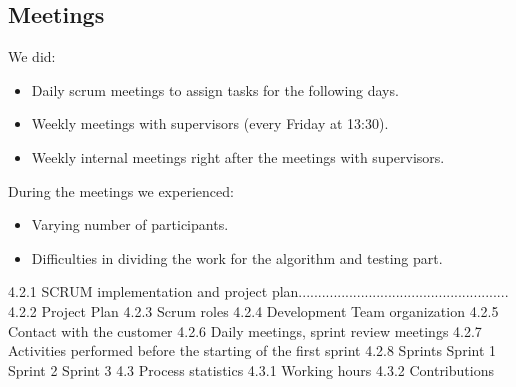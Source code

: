\subsection{Meetings}
We did:
\begin{itemize}
	\item Daily scrum meetings to assign tasks for the following days. 
	\item Weekly meetings with supervisors (every Friday at 13:30).
	\item Weekly internal meetings right after the meetings with supervisors.
\end{itemize} 
During the meetings we experienced:
\begin{itemize}
	\item Varying number of participants.
	\item Difficulties in dividing the work for the algorithm and testing part.
\end{itemize}

4.2.1 SCRUM implementation and project plan......................................................
4.2.2 Project Plan
4.2.3 Scrum roles
4.2.4 Development Team organization
4.2.5 Contact with the customer
4.2.6 Daily meetings, sprint review meetings
4.2.7 Activities performed before the starting of the first sprint
4.2.8 Sprints 
Sprint 1
Sprint 2
Sprint 3
4.3 Process statistics
4.3.1 Working hours
4.3.2 Contributions
